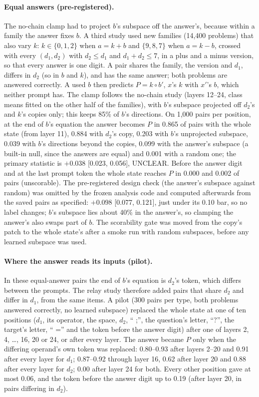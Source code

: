 \documentclass{article}
\begin{document}
\paragraph{Equal answers (pre-registered).} The no-chain clamp had to project $b$'s subspace off the answer's, because within a family the answer fixes $b$. A third study used new families (14,400 problems) that also vary $k$: $k \in \{0, 1, 2\}$ when $a = k + b$ and $\{9, 8, 7\}$ when $a = k - b$, crossed with every $(d_1, d_2)$ with $d_2 \le d_1$ and $d_1 + d_2 \le 7$, in a plus and a minus version, so that every answer is one digit. A pair shares the family, the version and $d_1$, differs in $d_2$ (so in $b$ and $k$), and has the same answer; both problems are answered correctly. A used $b$ then predicts $P = k \circ b'$, $x$'s $k$ with $x'$'s $b$, which neither prompt has. The clamp follows the no-chain study (layers 12--24, class means fitted on the other half of the families), with $b$'s subspace projected off $d_2$'s and $k$'s copies only; this keeps 85\% of $b$'s directions. On 1,000 pairs per position, at the end of $b$'s equation the answer becomes $P$ in 0.865 of pairs with the whole state (from layer 11), 0.884 with $d_2$'s copy, 0.203 with $b$'s unprojected subspace, 0.039 with $b$'s directions beyond the copies, 0.099 with the answer's subspace (a built-in null, since the answers are equal) and 0.001 with a random one; the primary statistic is $+0.038$ [0.023, 0.056], UNCLEAR. Before the answer digit and at the last prompt token the whole state reaches $P$ in 0.000 and 0.002 of pairs (unscorable). The pre-registered design check (the answer's subspace against random) was omitted by the frozen analysis code and computed afterwards from the saved pairs as specified: $+0.098$ [0.077, 0.121], just under its 0.10 bar, so no label changes; $b$'s subspace lies about 40\% in the answer's, so clamping the answer's also swaps part of $b$. The scorability gate was moved from the copy's patch to the whole state's after a smoke run with random subspaces, before any learned subspace was used.

\paragraph{Where the answer reads its inputs (pilot).} In these equal-answer pairs the end of $b$'s equation is $d_2$'s token, which differs between the prompts. The relay study therefore added pairs that share $d_2$ and differ in $d_1$, from the same items. A pilot (300 pairs per type, both problems answered correctly, no learned subspace) replaced the whole state at one of ten positions ($d_1$, its operator, the space, $d_2$, `` ;'', the question's letter, ``?'', the target's letter, `` ='' and the token before the answer digit) after one of layers 2, 4, \dots, 16, 20 or 24, or after every layer. The answer became $P$ only when the differing operand's own token was replaced: 0.80--0.93 after layers 2--20 and 0.91 after every layer for $d_1$; 0.87--0.92 through layer 16, 0.62 after layer 20 and 0.88 after every layer for $d_2$; 0.00 after layer 24 for both. Every other position gave at most 0.06, and the token before the answer digit up to 0.19 (after layer 20, in pairs differing in $d_2$).
\end{document}
